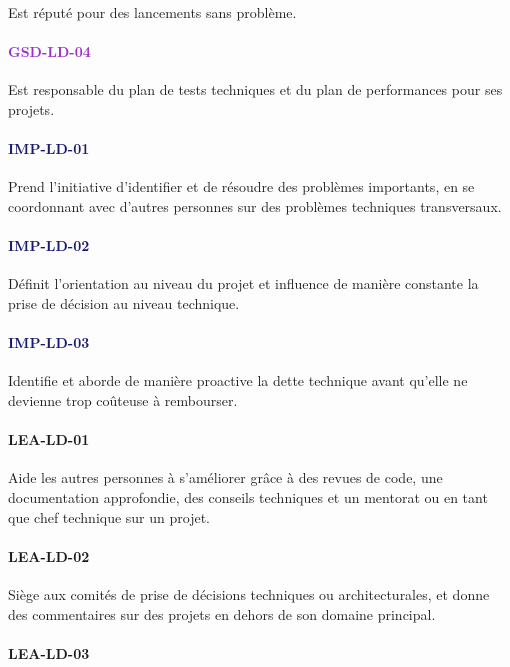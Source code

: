 \documentclass[a4paper, french, openany, 12pt]{book}
\newcommand\str[1]{\textcolor{DarkOrchid}{\textbf{\uppercase{gsd-{#1}}}}}
\newcommand\wis[1]{\textcolor{MidnightBlue}{\textbf{\uppercase{imp-{#1}}}}}
\newcommand\cha[1]{\textcolor{OliveGreen}{\textbf{\uppercase{lea-{#1}}}}}
\begin{document}
\begin{multicols}{2}
  Est réputé pour des lancements sans problème.

  \paragraph*{\str{ld-04}}

  Est responsable du plan de tests techniques et du plan de performances pour ses projets.

  \paragraph*{\wis{ld-01}}

  Prend l'initiative d'identifier et de résoudre des problèmes importants, en se coordonnant avec d'autres personnes sur
  des problèmes techniques transversaux.

  \paragraph*{\wis{ld-02}}

  Définit l'orientation au niveau du projet et influence de manière constante la prise de décision au niveau
  technique.
  \paragraph*{\wis{ld-03}}

  Identifie et aborde de manière proactive la dette technique avant qu'elle ne devienne trop coûteuse à rembourser.

  \paragraph*{\cha{ld-01}}

  Aide les autres personnes à s'améliorer grâce à des revues de code, une documentation approfondie, des conseils 
  techniques et un mentorat ou en tant que chef technique sur un projet.

  \paragraph*{\cha{ld-02}}

  Siège aux comités de prise de décisions techniques ou architecturales, et donne des commentaires sur des projets en 
  dehors de son domaine principal.
  
  \paragraph*{\cha{ld-03}}


\end{multicols}
\end{document}
